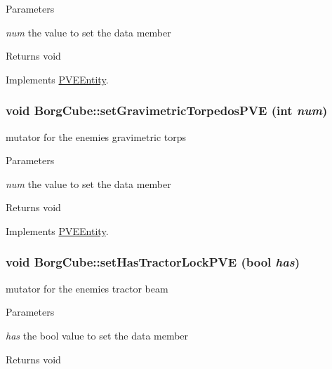 \begin{DoxyParams}{Parameters}
\item[{\em num}]the value to set the data member\end{DoxyParams}
\begin{DoxyReturn}{Returns}
void 
\end{DoxyReturn}


Implements \hyperlink{classPVEEntity}{PVEEntity}.

\hypertarget{classBorgCube_a58c2c36486db382f82ab33fcd3c16937}{
\subsubsection[{setGravimetricTorpedosPVE}]{\setlength{\rightskip}{0pt plus 5cm}void BorgCube::setGravimetricTorpedosPVE (int {\em num})}}
\label{d2/d93/classBorgCube_a58c2c36486db382f82ab33fcd3c16937}
mutator for the enemies gravimetric torps


\begin{DoxyParams}{Parameters}
\item[{\em num}]the value to set the data member\end{DoxyParams}
\begin{DoxyReturn}{Returns}
void 
\end{DoxyReturn}


Implements \hyperlink{classPVEEntity}{PVEEntity}.

\hypertarget{classBorgCube_ada98eeae90c300a04e787209bb8611df}{
\subsubsection[{setHasTractorLockPVE}]{\setlength{\rightskip}{0pt plus 5cm}void BorgCube::setHasTractorLockPVE (bool {\em has})}}
\label{d2/d93/classBorgCube_ada98eeae90c300a04e787209bb8611df}
mutator for the enemies tractor beam


\begin{DoxyParams}{Parameters}
\item[{\em has}]the bool value to set the data member\end{DoxyParams}
\begin{DoxyReturn}{Returns}
void 
\end{DoxyReturn}


